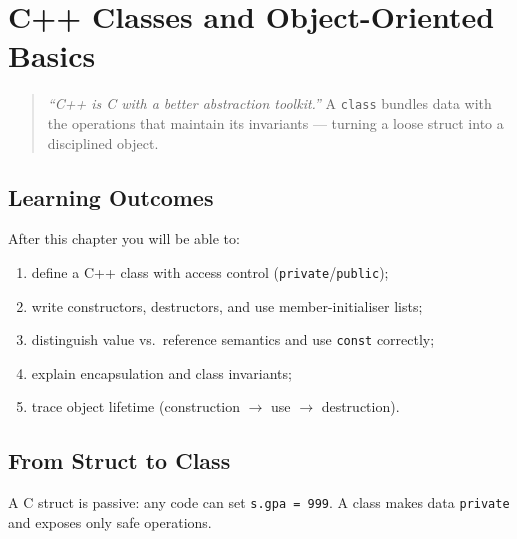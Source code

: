 \chapter{C++ Classes and Object-Oriented Basics}
\label{ch:cpp-classes-oop}

\begin{quote}
\emph{``C++ is C with a better abstraction toolkit.''} A \texttt{class} bundles data with the operations that maintain its invariants --- turning a loose struct into a disciplined object.
\end{quote}

\noindent{}

\section*{Learning Outcomes}
After this chapter you will be able to:
\begin{enumerate}[label=(L\arabic*)]
    \item define a C++ class with access control (\texttt{private}/\texttt{public});
    \item write constructors, destructors, and use member-initialiser lists;
    \item distinguish value vs.\ reference semantics and use \texttt{const} correctly;
    \item explain encapsulation and class invariants;
    \item trace object lifetime (construction $\to$ use $\to$ destruction).
\end{enumerate}

\section{From Struct to Class}
\label{sec:struct-to-class}
A C struct is passive: any code can set \texttt{s.gpa = 999}. A class makes data \texttt{private} and exposes only safe operations.

